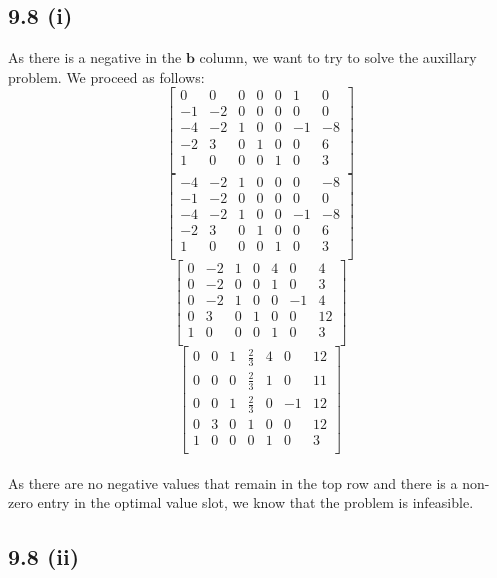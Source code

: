\documentclass[letterpaper,12pt]{article}
\theoremstyle{definition}
\begin{document}
\subsection*{9.8 (i)}
As there is a negative in the $\mathbf{b}$ column, we want to try to solve the auxillary problem. We proceed as follows:
\[
\begin{bmatrix}
0&0&0&0&0&1&0 \\
-1&-2&0&0&0&0&0 \\
-4&-2&1&0&0&-1&-8 \\
-2&3&0&1&0&0&6 \\
1&0&0&0&1&0&3 \\
\end{bmatrix}
\]
\[
\begin{bmatrix}
-4&-2&1&0&0&0&-8 \\
-1&-2&0&0&0&0&0 \\
-4&-2&1&0&0&-1&-8 \\
-2&3&0&1&0&0&6 \\
1&0&0&0&1&0&3 \\
\end{bmatrix}
\]
\[
\begin{bmatrix}
0&-2&1&0&4&0&4 \\
0&-2&0&0&1&0&3 \\
0&-2&1&0&0&-1&4 \\
0&3 &0&1&0&0&12 \\
1&0 &0&0&1&0&3 \\
\end{bmatrix}
\]
\[
\begin{bmatrix}
0&0&1&\frac{2}{3}&4&0&12 \\
0&0&0&\frac{2}{3}&1&0&11\\
0&0&1&\frac{2}{3}&0&-1&12 \\
0&3&0&1          &0&0&12 \\
1&0&0&0          &1&0&3 \\
\end{bmatrix}
\]
\\
As there are no negative values that remain in the top row and there is a non-zero entry in the optimal value slot, we know that the problem is infeasible.

\subsection*{9.8 (ii)}
\end{document}
